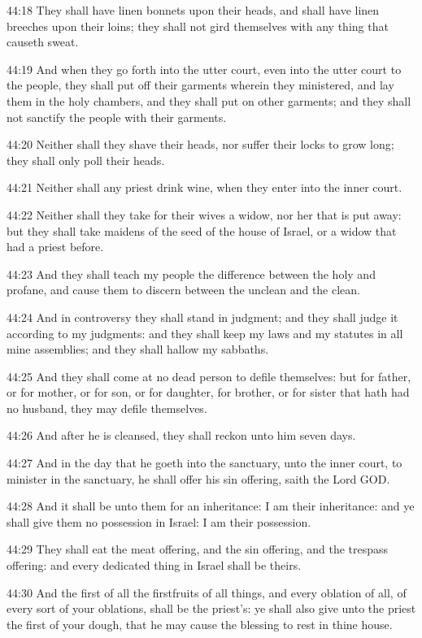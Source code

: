 44:18 They shall have linen bonnets upon their heads, and shall have
linen breeches upon their loins; they shall not gird themselves with
any thing that causeth sweat.

44:19 And when they go forth into the utter court, even into the utter
court to the people, they shall put off their garments wherein they
ministered, and lay them in the holy chambers, and they shall put on
other garments; and they shall not sanctify the people with their
garments.

44:20 Neither shall they shave their heads, nor suffer their locks to
grow long; they shall only poll their heads.

44:21 Neither shall any priest drink wine, when they enter into the
inner court.

44:22 Neither shall they take for their wives a widow, nor her that is
put away: but they shall take maidens of the seed of the house of
Israel, or a widow that had a priest before.

44:23 And they shall teach my people the difference between the holy
and profane, and cause them to discern between the unclean and the
clean.

44:24 And in controversy they shall stand in judgment; and they shall
judge it according to my judgments: and they shall keep my laws and my
statutes in all mine assemblies; and they shall hallow my sabbaths.

44:25 And they shall come at no dead person to defile themselves: but
for father, or for mother, or for son, or for daughter, for brother,
or for sister that hath had no husband, they may defile themselves.

44:26 And after he is cleansed, they shall reckon unto him seven days.

44:27 And in the day that he goeth into the sanctuary, unto the inner
court, to minister in the sanctuary, he shall offer his sin offering,
saith the Lord GOD.

44:28 And it shall be unto them for an inheritance: I am their
inheritance: and ye shall give them no possession in Israel: I am
their possession.

44:29 They shall eat the meat offering, and the sin offering, and the
trespass offering: and every dedicated thing in Israel shall be
theirs.

44:30 And the first of all the firstfruits of all things, and every
oblation of all, of every sort of your oblations, shall be the
priest's: ye shall also give unto the priest the first of your dough,
that he may cause the blessing to rest in thine house.

